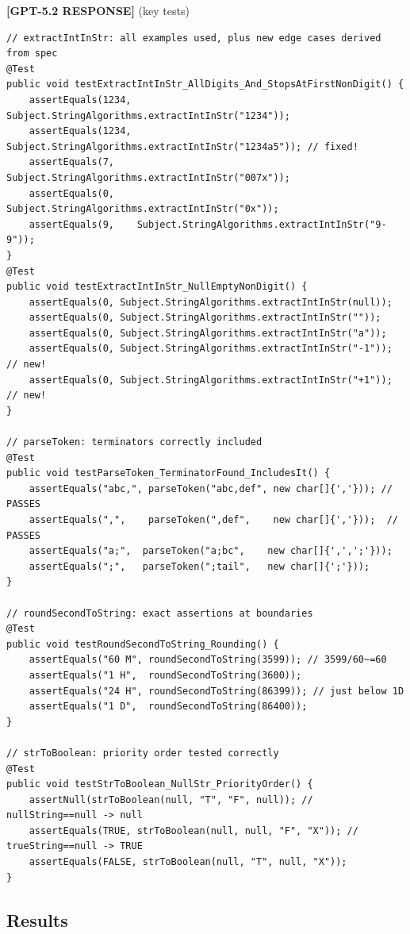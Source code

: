 \documentclass[acmsmall,nonacm]{acmart}
\begin{document}
\begin{responsebox}
\textbf{[GPT-5.2 RESPONSE]} (key tests)

\begin{verbatim}
// extractIntInStr: all examples used, plus new edge cases derived from spec
@Test
public void testExtractIntInStr_AllDigits_And_StopsAtFirstNonDigit() {
    assertEquals(1234, Subject.StringAlgorithms.extractIntInStr("1234"));
    assertEquals(1234, Subject.StringAlgorithms.extractIntInStr("1234a5")); // fixed!
    assertEquals(7,    Subject.StringAlgorithms.extractIntInStr("007x"));
    assertEquals(0,    Subject.StringAlgorithms.extractIntInStr("0x"));
    assertEquals(9,    Subject.StringAlgorithms.extractIntInStr("9-9"));
}
@Test
public void testExtractIntInStr_NullEmptyNonDigit() {
    assertEquals(0, Subject.StringAlgorithms.extractIntInStr(null));
    assertEquals(0, Subject.StringAlgorithms.extractIntInStr(""));
    assertEquals(0, Subject.StringAlgorithms.extractIntInStr("a"));
    assertEquals(0, Subject.StringAlgorithms.extractIntInStr("-1")); // new!
    assertEquals(0, Subject.StringAlgorithms.extractIntInStr("+1")); // new!
}

// parseToken: terminators correctly included
@Test
public void testParseToken_TerminatorFound_IncludesIt() {
    assertEquals("abc,", parseToken("abc,def", new char[]{','})); // PASSES
    assertEquals(",",    parseToken(",def",    new char[]{','}));  // PASSES
    assertEquals("a;",  parseToken("a;bc",    new char[]{',',';'}));
    assertEquals(";",   parseToken(";tail",   new char[]{';'}));
}

// roundSecondToString: exact assertions at boundaries
@Test
public void testRoundSecondToString_Rounding() {
    assertEquals("60 M", roundSecondToString(3599)); // 3599/60~=60
    assertEquals("1 H",  roundSecondToString(3600));
    assertEquals("24 H", roundSecondToString(86399)); // just below 1D
    assertEquals("1 D",  roundSecondToString(86400));
}

// strToBoolean: priority order tested correctly
@Test
public void testStrToBoolean_NullStr_PriorityOrder() {
    assertNull(strToBoolean(null, "T", "F", null)); // nullString==null -> null
    assertEquals(TRUE, strToBoolean(null, null, "F", "X")); // trueString==null -> TRUE
    assertEquals(FALSE, strToBoolean(null, "T", null, "X"));
}
\end{verbatim}
\end{responsebox}

\subsection{Results}
\end{document}
